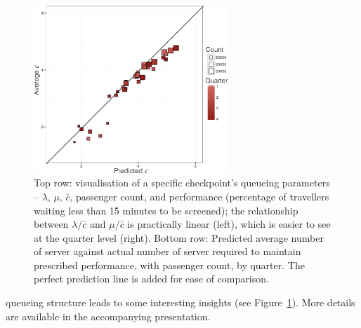 \begin{figure}[!t]
\includegraphics[width=0.65\textwidth]{Images/CATSA4.png}  
\caption{\small Top row: visualisation of a specific checkpoint's queueing parameters -- $\lambda$, $\mu$, $\bar{c}$, passenger count, and performance (percentage of travellers waiting less than 15 minutes to be screened); the relationship between $\lambda/\bar{c}$ and $\mu/\bar{c}$ is practically linear (left), which is easier to see at the quarter level (right). Bottom row: Predicted average number of server against actual number of server required to maintain prescribed performance, with passenger count, by quarter. The perfect prediction line is added for ease of comparison.}\label{fig:checkpoint}
\end{figure} queueing structure leads to some interesting insights  (see Figure~\ref{fig:checkpoint}). More details are available in the accompanying presentation. 